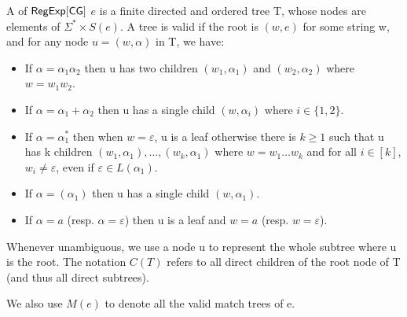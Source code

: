 \begin{definition}
	A  of ${\sf RegExp}[\sf CG]$ $e$ is a finite directed and ordered
	tree T, whose nodes are elements of $\Sigma^{\ast} \times S (e)$. A tree
	is valid if the root is $(w, e)$ for some string w, and for any node $u =
	(w, \alpha)$ in T, we have:
	\begin{itemize}
		\item If $\alpha = \alpha_1 \alpha_2$ then u has two children $(w_1,
		\alpha_1)$ and $(w_2, \alpha_2)$ where $w = w_1 w_2$.
		
		\item If $\alpha = \alpha_1 + \alpha_2$ then u has a single child $(w,
		\alpha_i)$ where $i \in \{ 1, 2 \}$.
		
		\item If $\alpha = \alpha_1^{\ast}$ then when $w = \varepsilon$, u is a
		leaf otherwise there is $k \geqslant 1$ such that u has k children $(w_1,
		\alpha_1), \ldots, (w_k, \alpha_1)$ where $w = w_1 \ldots w_k$ and for all
		$i \in [k]$, $w_i \neq \varepsilon$, even if $\varepsilon \in L
		(\alpha_1)$.
		
		\item If $\alpha = (\alpha_1)$ then u has a single child $(w, \alpha_1)$.
		
		\item If $\alpha = a$ (resp. $\alpha = \varepsilon$) then u is a leaf and
		$w = a$ (resp. $w = \varepsilon$).
	\end{itemize}
	
	Whenever unambiguous, we use a node u to represent the whole subtree
	where u is the root. The notation $C(T)$ refers to all direct children of the root node of T
	(and thus all direct subtrees).
	
	We also use $M (e)$ to denote all the valid match trees of e.
\end{definition}

